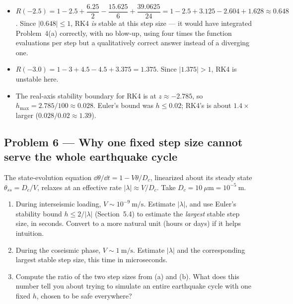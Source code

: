 \solution
\begin{itemize}
\item[(a)] $R(-2.5) = 1-2.5+\dfrac{6.25}{2}-\dfrac{15.625}{6}+\dfrac{39.0625}{24} = 1-2.5+3.125-2.604+1.628 \approx 0.648$. Since $|0.648|\le1$, RK4 \emph{is} stable at this step size --- it would have integrated Problem~4(a) correctly, with no blow-up, using four times the function evaluations per step but a qualitatively correct answer instead of a diverging one.
\item[(b)] $R(-3.0) = 1-3+4.5-4.5+3.375 = 1.375$. Since $|1.375|>1$, RK4 is unstable here.
\item[(c)] The real-axis stability boundary for RK4 is at $z\approx-2.785$, so $h_{\max} = 2.785/100 \approx 0.028$. Euler's bound was $h\le0.02$; RK4's is about $1.4\times$ larger ($0.028/0.02\approx1.39$).
\end{itemize}


\subsection*{Problem 6 --- Why one fixed step size cannot serve the whole earthquake cycle}

The state-evolution equation $\dd\theta/\dd t = 1-V\theta/D_c$, linearized about its steady state $\theta_{ss}=D_c/V$, relaxes at an effective rate $|\lambda| \approx V/D_c$. Take $D_c = 10\ \mu\mathrm{m} = 10^{-5}\ \mathrm{m}$.

\begin{enumerate}[label=(\alph*)]
\item During interseismic loading, $V\sim10^{-9}\ \mathrm{m/s}$. Estimate $|\lambda|$, and use Euler's stability bound $h\le2/|\lambda|$ (Section~5.4) to estimate the \emph{largest} stable step size, in seconds. Convert to a more natural unit (hours or days) if it helps intuition.
\item During the coseismic phase, $V\sim1\ \mathrm{m/s}$. Estimate $|\lambda|$ and the corresponding largest stable step size, this time in microseconds.
\item Compute the ratio of the two step sizes from (a) and (b). What does this number tell you about trying to simulate an entire earthquake cycle with one fixed $h$, chosen to be safe everywhere?
\end{enumerate}


